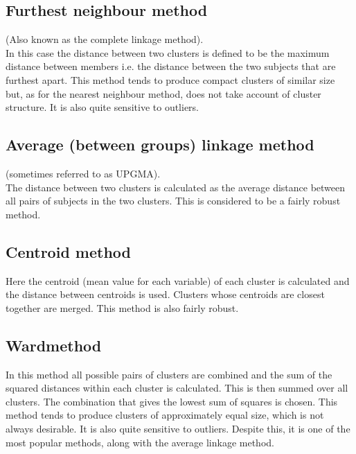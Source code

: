 \subsection{Furthest neighbour method}
(Also known as the complete linkage method).\\
In this case the distance between two clusters is defined to be the maximum distance
between members  i.e. the distance between the two subjects that are furthest apart.
This method tends to produce compact clusters of similar size but, as for the nearest
neighbour method, does not take account of cluster structure. It is also quite sensitive
to outliers.

\subsection{Average (between groups) linkage method }
(sometimes referred to as UPGMA).\\
The distance between two clusters is calculated as the average distance between all pairs
of subjects in the two clusters. This is considered to be a fairly robust method.

\subsection{Centroid method}
Here the centroid (mean value for each variable) of each cluster is calculated and the
distance between centroids is used. Clusters whose centroids are closest together are
merged. This method is also fairly robust.

\subsection{Wardmethod}
In this method all possible pairs of clusters are combined and the sum of the squared
distances within each cluster is calculated. This is then summed over all clusters. The
combination that gives the lowest sum of squares is chosen. This method tends to
produce clusters of approximately equal size, which is not always desirable. It is also
quite sensitive to outliers. Despite this, it is one of the most popular methods, along
with the average linkage method.

